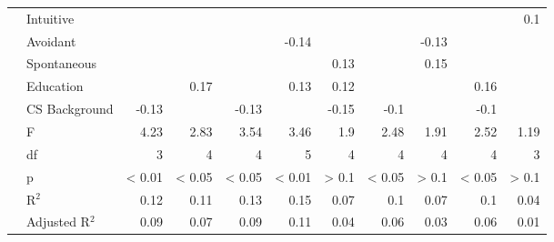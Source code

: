 \begin{table*}
{\begin{tabular}{rl|r|rr|rrr|rrr}
    \rowcolor[rgb]{ .988,  .835,  .706}   & Intuitive & \cellcolor[rgb]{ 1,  1,  1}  & \cellcolor[rgb]{ 1,  1,  1}  & \cellcolor[rgb]{ 1,  1,  1}  & \cellcolor[rgb]{ 1,  1,  1}  & \cellcolor[rgb]{ 1,  1,  1}  & \cellcolor[rgb]{ 1,  1,  1}  & \cellcolor[rgb]{ 1,  1,  1}  & \cellcolor[rgb]{ 1,  1,  1}  & \cellcolor[rgb]{ .996,  .898,  .51} 0.1 \\
    \rowcolor[rgb]{ .988,  .835,  .706}   & Avoidant & \cellcolor[rgb]{ 1,  1,  1}  & \cellcolor[rgb]{ 1,  1,  1}  & \cellcolor[rgb]{ 1,  1,  1}  & \cellcolor[rgb]{ .984,  .639,  .463} -0.14 & \cellcolor[rgb]{ 1,  1,  1}  & \cellcolor[rgb]{ 1,  1,  1}  & \cellcolor[rgb]{ .984,  .647,  .463} -0.13 & \cellcolor[rgb]{ 1,  1,  1}  & \cellcolor[rgb]{ 1,  1,  1}  \\
    \rowcolor[rgb]{ .988,  .835,  .706}   & Spontaneous & \cellcolor[rgb]{ 1,  1,  1}  & \cellcolor[rgb]{ 1,  1,  1}  & \cellcolor[rgb]{ 1,  1,  1}  & \cellcolor[rgb]{ 1,  1,  1}  & \cellcolor[rgb]{ .984,  .918,  .518} 0.13 & \cellcolor[rgb]{ 1,  1,  1}  & \cellcolor[rgb]{ .949,  .91,  .518} 0.15 & \cellcolor[rgb]{ 1,  1,  1}  & \cellcolor[rgb]{ 1,  1,  1}  \\
      & Education &   & \cellcolor[rgb]{ .914,  .898,  .514} 0.17 &   & \cellcolor[rgb]{ .984,  .918,  .518} 0.13 & \cellcolor[rgb]{ 1,  .922,  .518} 0.12 &   &   & \cellcolor[rgb]{ .933,  .902,  .514} 0.16 &  \\
      & CS Background & \cellcolor[rgb]{ .984,  .647,  .463} -0.13 &   & \cellcolor[rgb]{ .984,  .647,  .463} -0.13 &   & \cellcolor[rgb]{ .98,  .627,  .459} -0.15 & \cellcolor[rgb]{ .984,  .682,  .471} -0.1 &   & \cellcolor[rgb]{ .984,  .682,  .471} -0.1 &  \\
    \midrule
      & F & 4.23 & 2.83 & 3.54 & 3.46 & 1.9 & 2.48 & 1.91 & 2.52 & 1.19 \\
      & df & 3 & 4 & 4 & 5 & 4 & 4 & 4 & 4 & 3 \\
      & p & < 0.01 & < 0.05 & < 0.05 & < 0.01 & > 0.1 & < 0.05 & > 0.1 & < 0.05 & > 0.1 \\
      & R$^2$ & \cellcolor[rgb]{ .761,  .898,  .804} 0.12 & \cellcolor[rgb]{ .788,  .91,  .827} 0.11 & \cellcolor[rgb]{ .733,  .886,  .78} 0.13 & \cellcolor[rgb]{ .675,  .863,  .729} 0.15 & \cellcolor[rgb]{ .906,  .957,  .929} 0.07 & \cellcolor[rgb]{ .82,  .922,  .855} 0.1 & \cellcolor[rgb]{ .906,  .957,  .929} 0.07 & \cellcolor[rgb]{ .82,  .922,  .855} 0.1 & \cellcolor[rgb]{ .988,  .988,  1} 0.04 \\
      & Adjusted R$^2$ & \cellcolor[rgb]{ .706,  .875,  .757} 0.09 & \cellcolor[rgb]{ .776,  .906,  .82} 0.07 & \cellcolor[rgb]{ .706,  .875,  .757} 0.09 & \cellcolor[rgb]{ .635,  .847,  .698} 0.11 & \cellcolor[rgb]{ .882,  .949,  .91} 0.04 & \cellcolor[rgb]{ .812,  .918,  .851} 0.06 & \cellcolor[rgb]{ .918,  .961,  .941} 0.03 & \cellcolor[rgb]{ .812,  .918,  .851} 0.06 & \cellcolor[rgb]{ .988,  .988,  1} 0.01 \\
    \bottomrule
    \bottomrule
    \end{tabular}%
}
  \label{tab:Regression-Rating}%
\end{table*}%